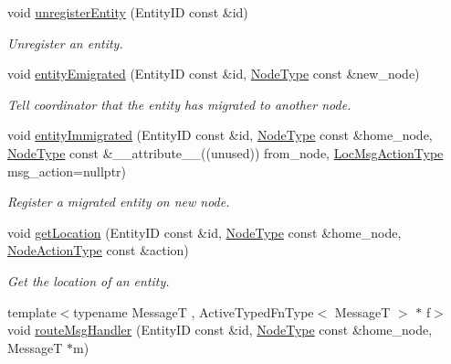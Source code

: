 \begin{DoxyCompactItemize}
void \hyperlink{structvt_1_1location_1_1_entity_location_coord_a076ec3a6b06e74567e7281adb0645cd7}{unregister\+Entity} (Entity\+ID const \&id)
\begin{DoxyCompactList}\small\item\em Unregister an entity. \end{DoxyCompactList}\item 
void \hyperlink{structvt_1_1location_1_1_entity_location_coord_a770fca228907ff6f818ab184d7580a5e}{entity\+Emigrated} (Entity\+ID const \&id, \hyperlink{namespacevt_a866da9d0efc19c0a1ce79e9e492f47e2}{Node\+Type} const \&new\+\_\+node)
\begin{DoxyCompactList}\small\item\em Tell coordinator that the entity has migrated to another node. \end{DoxyCompactList}\item 
void \hyperlink{structvt_1_1location_1_1_entity_location_coord_a67df1eb9ae48ef4b181dafda9ae3ff71}{entity\+Immigrated} (Entity\+ID const \&id, \hyperlink{namespacevt_a866da9d0efc19c0a1ce79e9e492f47e2}{Node\+Type} const \&home\+\_\+node, \hyperlink{namespacevt_a866da9d0efc19c0a1ce79e9e492f47e2}{Node\+Type} const \&\+\_\+\+\_\+attribute\+\_\+\+\_\+((unused)) from\+\_\+node, \hyperlink{namespacevt_1_1location_ad0a130e4d79e745543925240e13e8f08}{Loc\+Msg\+Action\+Type} msg\+\_\+action=nullptr)
\begin{DoxyCompactList}\small\item\em Register a migrated entity on new node. \end{DoxyCompactList}\item 
void \hyperlink{structvt_1_1location_1_1_entity_location_coord_a129f501be83c7fceb47466c34d733248}{get\+Location} (Entity\+ID const \&id, \hyperlink{namespacevt_a866da9d0efc19c0a1ce79e9e492f47e2}{Node\+Type} const \&home\+\_\+node, \hyperlink{namespacevt_1_1location_a3a9235e0ceb341bef225d2cc46606e9e}{Node\+Action\+Type} const \&action)
\begin{DoxyCompactList}\small\item\em Get the location of an entity. \end{DoxyCompactList}\item 
{\footnotesize template$<$typename MessageT , Active\+Typed\+Fn\+Type$<$ Message\+T $>$ $\ast$ f$>$ }\\void \hyperlink{structvt_1_1location_1_1_entity_location_coord_a0432bf605db83627c15e2c53920aff97}{route\+Msg\+Handler} (Entity\+ID const \&id, \hyperlink{namespacevt_a866da9d0efc19c0a1ce79e9e492f47e2}{Node\+Type} const \&home\+\_\+node, MessageT $\ast$m)

\end{DoxyCompactItemize}
